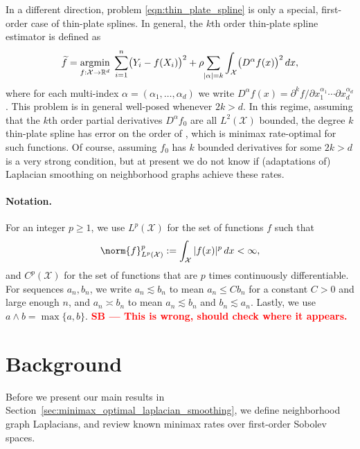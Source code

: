 \documentclass[twoside]{article}
\newcommand{\red}[1]{\textcolor{red}{#1}}
\newcommand{\sbcomment}[1]{{\bf{{\red{{SB --- #1}}}}}}
\newcommand{\Reals}{\mathbb{R}}
\newcommand{\1}{\mathbf{1}}
\DeclareMathOperator*{\argmin}{argmin}
\newcommand{\Rd}{\Reals^d}
\newcommand{\Xset}{\mathcal{X}}
\newcommand{\Leb}{L}
\newcommand{\wt}[1]{\widetilde{#1}}
\theoremstyle{definition}
\theoremstyle{remark}
\begin{document}
In a different direction, problem \eqref{eqn:thin_plate_spline} is only a special, first-order case of thin-plate splines. In general, the $k$th order thin-plate spline estimator is defined as
\begin{equation*}
\wt{f} = \argmin_{f : \Xset \to \Rd} \; \sum_{i = 1}^{n} \bigl(Y_i - f(X_i)\bigr)^2 + \rho \hspace{-2pt} \sum_{|\alpha| = k} \int_{\Xset} \bigl(D^\alpha f(x)\bigr)^2 \,dx,
\end{equation*}
where for each multi-index $\alpha=(\alpha_1,\ldots,\alpha_d)$ we write $D^\alpha f(x) = \partial^kf/\partial x_{1}^{\alpha_1} \cdots \partial x_{d}^{\alpha_d}$. This problem is in general well-posed whenever $2k > d$. In this regime, assuming that the $k$th order partial derivatives $D^\alpha f_0$ are all $\Leb^2(\Xset)$ bounded, the degree $k$ thin-plate spline has error on the order of  \citep{vandergeer2000}, which is minimax rate-optimal for such functions. Of course, assuming $f_0$ has $k$ bounded derivatives for some $2k > d$ is a very strong condition, but at present we do not know if (adaptations of) Laplacian smoothing on neighborhood graphs achieve these rates.

\paragraph{Notation.}

For an integer $p \geq 1$, we use $\Leb^p(\Xset)$ for the set of functions $f$ such that 
\begin{equation*}
\norm{f}_{\Leb^p(\Xset)}^p := \int_{\Xset} |f(x)|^p \,dx < \infty,
\end{equation*}
and $C^p(\Xset)$ for the set of functions that are $p$ times continuously differentiable. For sequences $a_n,b_n$, we write $a_n \lesssim b_n$ to mean $a_n \leq Cb_n$ for a constant $C>0$ and large enough $n$, and $a_n \asymp b_n$ to mean $a_n \lesssim b_n$ and $b_n \lesssim a_n$. Lastly, we use $a \wedge b = \max\{a,b\}$. \sbcomment{This is wrong, should check where it appears.}

\section{Background}
\label{sec:problem_setup_and_background}

Before we present our main results in Section~\ref{sec:minimax_optimal_laplacian_smoothing}, we define neighborhood graph Laplacians, and review known minimax rates over first-order Sobolev spaces.
\end{document}
